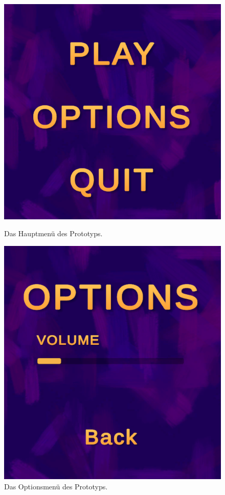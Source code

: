 \begin{figure}[H]
    \centering
    \begin{minipage}{0.4\textwidth}
        \centering
        \includegraphics[width=\linewidth]{chapters/03/images/MainMenu.png}
        \caption{Das Hauptmenü des Prototyps.}
        \label{htl02a}
    \end{minipage}%
    \hspace{1cm}%
    \begin{minipage}{0.4\textwidth}
        \centering
        \includegraphics[width=\linewidth]{chapters/03/images/OptionsMainMenu.png}
        \caption{Das Optionsmenü des Prototyps.}
        \label{htl02b}
    \end{minipage}
\end{figure}

